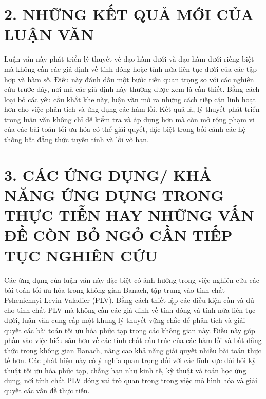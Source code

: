 \section*{2. NHỮNG KẾT QUẢ MỚI CỦA LUẬN VĂN}

Luận văn này phát triển lý thuyết về đạo hàm dưới và đạo hàm dưới riêng biệt mà không cần các giả định về tính đóng hoặc tính nửa liên tục dưới của các tập hợp và hàm số. Điều này đánh dấu một bước tiến quan trọng so với các nghiên cứu trước đây, nơi mà các giả định này thường được xem là cần thiết. Bằng cách loại bỏ các yêu cầu khắt khe này, luận văn mở ra những cách tiếp cận linh hoạt hơn cho việc phân tích và ứng dụng các hàm lồi. Kết quả là, lý thuyết phát triển trong luận văn không chỉ dễ kiểm tra và áp dụng hơn mà còn mở rộng phạm vi của các bài toán tối ưu hóa có thể giải quyết, đặc biệt trong bối cảnh các hệ thống bất đẳng thức tuyến tính và lồi vô hạn.

\section*{3. CÁC ỨNG DỤNG/ KHẢ NĂNG ỨNG DỤNG TRONG THỰC TIỄN HAY NHỮNG VẤN ĐỀ CÒN BỎ NGỎ CẦN TIẾP TỤC NGHIÊN CỨU}

Các ứng dụng của luận văn này đặc biệt có ảnh hưởng trong việc nghiên cứu các bài toán tối ưu hóa trong không gian Banach, tập trung vào tính chất Pshenichnyi-Levin-Valadier (PLV). Bằng cách thiết lập các điều kiện cần và đủ cho tính chất PLV mà không cần các giả định về tính đóng và tính nửa liên tục dưới, luận văn cung cấp một khung lý thuyết vững chắc để phân tích và giải quyết các bài toán tối ưu hóa phức tạp trong các không gian này. Điều này góp phần vào việc hiểu sâu hơn về các tính chất cấu trúc của các hàm lồi và bất đẳng thức trong không gian Banach, nâng cao khả năng giải quyết nhiều bài toán thực tế hơn. Các phát hiện này có ý nghĩa quan trọng đối với các lĩnh vực đòi hỏi kỹ thuật tối ưu hóa phức tạp, chẳng hạn như kinh tế, kỹ thuật và toán học ứng dụng, nơi tính chất PLV đóng vai trò quan trọng trong việc mô hình hóa và giải quyết các vấn đề thực tiễn.

